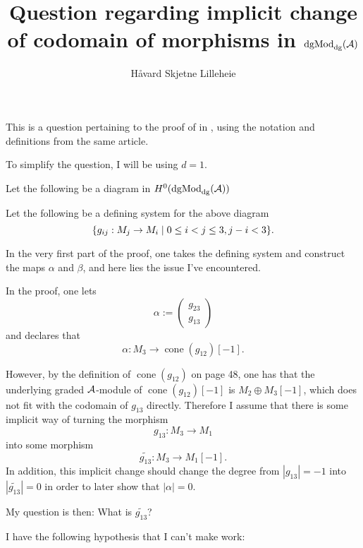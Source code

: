 \documentclass[a4paper, 12pt]{article}
\title{Question regarding implicit change of codomain of morphisms in \( \operatorname{dgMod}_{\operatorname{dg}}({\mathcal{A}}) \)}
\author{Håvard Skjetne Lilleheie}
\DeclareMathOperator{\cone}{cone}
\begin{document}
\maketitle

This is a question pertaining to the proof of in \cite[Proposition 4.2.8]{Jasso--Muro_2023_arXiv}, using the notation and definitions from the same article.

To simplify the question, I will be using \( d = 1 \).

Let the following be a diagram in \( H^0(\operatorname{dgMod}_{\operatorname{dg}}({\mathcal{A}})) \)
\begin{center}
\end{center}

Let the following be a defining system for the above diagram
\[
    \{g_{ij}: M_j \to M_i \mid 0 \leq i < j \leq 3, j - i < 3\}.
\]

In the very first part of the proof, one takes the defining system and construct the maps \( \alpha \) and \( \beta \), and here lies the issue I've encountered.

In the proof, one lets
\[
    \alpha :=
    \begin{pmatrix}
        g_{23} \\
        g_{13}
    \end{pmatrix}
\]
and declares that
\[
    \alpha: M_3 \to \cone(g_{12})[-1].
\]

However, by the definition of \( \cone(g_{12}) \) on page 48, one has that the underlying graded \( {\mathcal{A}} \)-module of \( \cone(g_{12})[-1] \) is \( M_2 \oplus M_3[-1] \), which does not fit with the codomain of \( g_{13} \) directly. Therefore I assume that there is some implicit way of turning the morphism
\[
    g_{13}: M_3 \to M_1
\]
into some morphism
\[
    \widetilde{g_{13}}: M_3 \to M_1[-1].
\]
In addition, this implicit change should change the degree from \( |g_{13}| = -1 \) into \( |\widetilde{g_{13}}| = 0 \) in order to later show that \( |\alpha| = 0 \).

My question is then: What is \( \widetilde{g_{13}} \)?

I have the following hypothesis that I can't make work:
\end{document}
